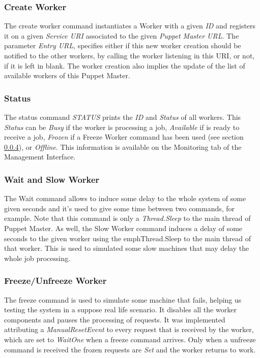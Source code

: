 \documentclass[times, 10pt,twocolumn]{article}
\begin{document}
            \subsubsection{Create Worker}
            
            The create worker command instantiates a Worker with a given \emph{ID} and registers it on a given \emph{Service URI} associated to the given \emph{Puppet Master URL}. The parameter \emph{Entry URL}, specifies either if this new worker creation should be notified to the other workers, by calling the worker listening in this URI, or not, if it is left in blank. The worker creation also implies the update of the list of available workers of this Puppet Master.
            
            \subsubsection{Status}

            The status command \emph{STATUS} prints the \emph{ID} and \emph{Status} of all workers. This \emph{Status} can be  \emph{Busy} if the worker is processing a job, \emph{Available} if is ready to receive a job, \emph{Frozen} if a Freeze Worker command has been used (see section \ref{freeze}), or \emph{Offline}. This information is available on the Monitoring tab of the Management Interface.

            \subsubsection{Wait and Slow Worker}
            
            The Wait command allows to induce some delay to the whole system of some given seconds and it's used to give some time between two commands, for example. Note that this command is only a \emph{Thread.Sleep} to the main thread of Puppet Master. As well, the Slow Worker command induces a delay of some seconds to the given worker using the emph{Thread.Sleep} to the main thread of that worker. This is used to simulated some slow machines that may delay the whole job processing.

            \subsubsection{Freeze/Unfreeze Worker} \label{freeze}
            
            The freeze command is used to simulate some machine that fails, helping us testing the system in a suppose real life scenario. It disables all the worker components and pauses the processing of requests. It was implemented attributing a \emph{ManualResetEvent} to every request that is received by the worker, which are set to \emph{WaitOne} when a freeze command arrives. Only when a unfreeze command is received the frozen requests are \emph{Set} and the worker returns to work.
\end{document}
